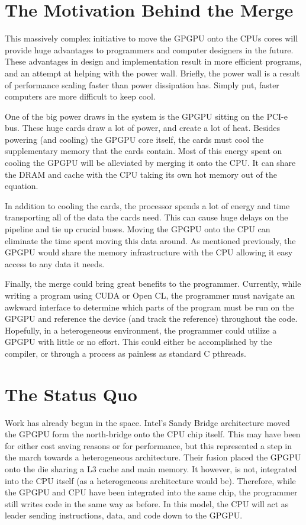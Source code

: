 \section*{The Motivation Behind the Merge}

This massively complex initiative to move the GPGPU onto the CPUs cores will provide huge advantages to programmers and computer designers in the future. These advantages in design and implementation result in more efficient programs, and an attempt at helping with the power wall. Briefly, the power wall is a result of performance scaling faster than power dissipation has. Simply put, faster computers are more difficult to keep cool.  

One of the big power draws in the system is the GPGPU sitting on the PCI-e bus. These huge cards draw a lot of power, and create a lot of heat. Besides powering (and cooling) the GPGPU core itself, the cards must cool the supplementary memory that the cards contain. Most of this energy spent on cooling the GPGPU will be alleviated by merging it onto the CPU. It can share the DRAM and cache with the CPU taking its own hot memory out of the equation. 

In addition to cooling the cards, the processor spends a lot of energy and time transporting all of the data the cards need. This can cause huge delays on the pipeline and tie up crucial buses. Moving the GPGPU onto the CPU can eliminate the time spent moving this data around. As mentioned previously, the GPGPU would share the memory infrastructure with the CPU allowing it easy access to any data it needs. 

Finally, the merge could bring great benefits to the programmer. Currently, while writing a program using CUDA or Open CL, the programmer must navigate an awkward interface to determine which parts of the program must be run on the GPGPU and reference the device (and track the reference) throughout the code. Hopefully, in a heterogeneous environment, the programmer could utilize a GPGPU with little or no effort. This could either be accomplished by the compiler, or through a process as painless as standard C pthreads. 

\section*{The Status Quo}

Work has already begun in the space. Intel's Sandy Bridge architecture moved the GPGPU form the north-bridge onto the CPU chip itself.\cite{tlpcache} This may have been for either cost saving reasons or for performance, but this represented a step in the march towards a heterogeneous architecture. Their fusion placed the GPGPU onto the die sharing a L3 cache and main memory. It however, is not, integrated into the CPU itself (as a heterogeneous architecture would be). Therefore, while the GPGPU and CPU have been integrated into the same chip, the programmer still writes code in the same way as before. In this model, the CPU will act as leader sending instructions, data, and code down to the GPGPU. 

